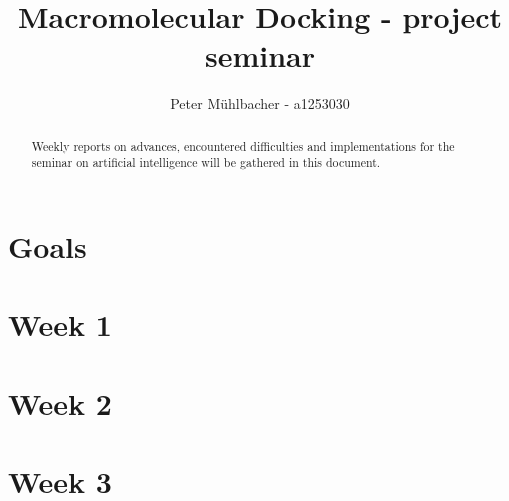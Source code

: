 \documentclass[12pt]{article}
\title{Macromolecular Docking - project seminar}
\author{Peter M\"uhlbacher - a1253030}
\theoremstyle{definition}\newtheorem*{definition}{Definition}
\theoremstyle{definition}\newtheorem*{remark}{Remark}
\begin{document}
\maketitle
\tableofcontents

\begin{abstract}
Weekly reports on advances, encountered difficulties and implementations for the seminar on artificial intelligence will be gathered in this document.
\end{abstract}

\section*{Goals}


\section{Week 1}


\section{Week 2}


\section{Week 3}




\end{document}

